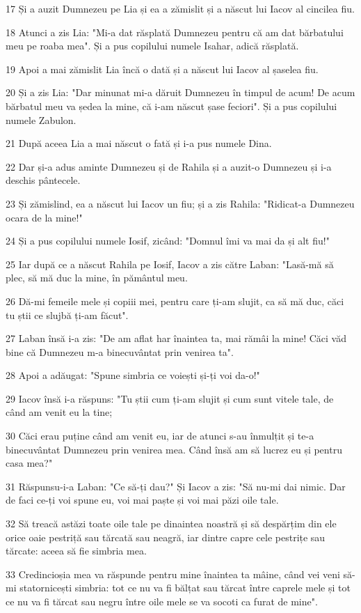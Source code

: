 \par 17 Și a auzit Dumnezeu pe Lia și ea a zămislit și a născut lui Iacov al cincilea fiu.
\par 18 Atunci a zis Lia: "Mi-a dat răsplată Dumnezeu pentru că am dat bărbatului meu pe roaba mea". Și a pus copilului numele Isahar, adică răsplată.
\par 19 Apoi a mai zămislit Lia încă o dată și a născut lui Iacov al șaselea fiu.
\par 20 Și a zis Lia: "Dar minunat mi-a dăruit Dumnezeu în timpul de acum! De acum bărbatul meu va ședea la mine, că i-am născut șase feciori". Și a pus copilului numele Zabulon.
\par 21 După aceea Lia a mai născut o fată și i-a pus numele Dina.
\par 22 Dar și-a adus aminte Dumnezeu și de Rahila și a auzit-o Dumnezeu și i-a deschis pântecele.
\par 23 Și zămislind, ea a născut lui Iacov un fiu; și a zis Rahila: "Ridicat-a Dumnezeu ocara de la mine!"
\par 24 Și a pus copilului numele Iosif, zicând: "Domnul îmi va mai da și alt fiu!"
\par 25 Iar după ce a născut Rahila pe Iosif, Iacov a zis către Laban: "Lasă-mă să plec, să mă duc la mine, în pământul meu.
\par 26 Dă-mi femeile mele și copiii mei, pentru care ți-am slujit, ca să mă duc, căci tu știi ce slujbă ți-am făcut".
\par 27 Laban însă i-a zis: "De am aflat har înaintea ta, mai rămâi la mine! Căci văd bine că Dumnezeu m-a binecuvântat prin venirea ta".
\par 28 Apoi a adăugat: "Spune simbria ce voiești și-ți voi da-o!"
\par 29 Iacov însă i-a răspuns: "Tu știi cum ți-am slujit și cum sunt vitele tale, de când am venit eu la tine;
\par 30 Căci erau puține când am venit eu, iar de atunci s-au înmulțit și te-a binecuvântat Dumnezeu prin venirea mea. Când însă am să lucrez eu și pentru casa mea?"
\par 31 Răspunsu-i-a Laban: "Ce să-ți dau?" Și Iacov a zis: "Să nu-mi dai nimic. Dar de faci ce-ți voi spune eu, voi mai paște și voi mai păzi oile tale.
\par 32 Să treacă astăzi toate oile tale pe dinaintea noastră și să despărțim din ele orice oaie pestriță sau tărcată sau neagră, iar dintre capre cele pestrițe sau tărcate: aceea să fie simbria mea.
\par 33 Credincioșia mea va răspunde pentru mine înaintea ta mâine, când vei veni să-mi statornicești simbria: tot ce nu va fi bălțat sau tărcat între caprele mele și tot ce nu va fi tărcat sau negru între oile mele se va socoti ca furat de mine".
